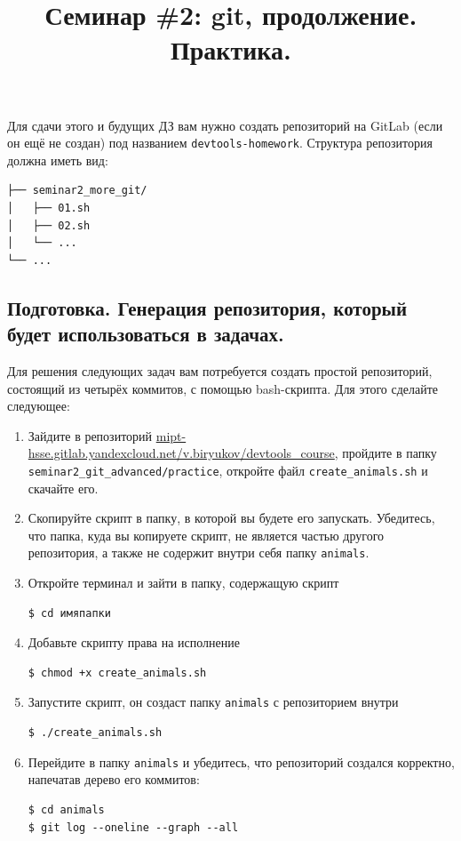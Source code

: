 \documentclass{article}
\begin{document}
\title{Семинар \#2: git, продолжение. Практика. \vspace{-5ex}}\date{}\maketitle
Для сдачи этого и будущих ДЗ вам нужно создать репозиторий на GitLab (если он ещё не создан) под названием \texttt{devtools-homework}. Структура репозитория должна иметь вид:
\begin{center}
\begin{BVerbatim}
├── seminar2_more_git/
│   ├── 01.sh
│   ├── 02.sh
│   └── ...
└── ...
\end{BVerbatim}
\end{center}



\subsection*{Подготовка. Генерация репозитория, который будет использоваться в задачах.}
Для решения следующих задач вам потребуется создать простой репозиторий, состоящий из четырёх коммитов, с помощью bash-скрипта. Для этого сделайте следующее:
\begin{enumerate}
\item Зайдите в репозиторий \href{https://mipt-hsse.gitlab.yandexcloud.net/v.biryukov/devtools_course}{mipt-hsse.gitlab.yandexcloud.net/v.biryukov/devtools\_course}, пройдите в папку\\ 
\texttt{seminar2\_git\_advanced/practice}, откройте файл \texttt{create\_animals.sh} и скачайте его.

\item Скопируйте скрипт в папку, в которой вы будете его запускать. Убедитесь, что папка, куда вы копируете скрипт, не является частью другого репозитория, а также не содержит внутри себя папку \texttt{animals}.

\item Откройте терминал и зайти в папку, содержащую скрипт
\begin{lstlisting}
$ cd имяпапки
\end{lstlisting}

\item Добавьте скрипту права на исполнение
\begin{lstlisting}[style=csMiptBash]
$ chmod +x create_animals.sh
\end{lstlisting}

\item Запустите скрипт, он создаст папку \texttt{animals} с репозиторием внутри
\begin{lstlisting}[style=csMiptBash]
$ ./create_animals.sh
\end{lstlisting}

\item Перейдите в папку \texttt{animals} и убедитесь, что репозиторий создался корректно, напечатав дерево его коммитов:
\begin{lstlisting}[style=csMiptBash]
$ cd animals
$ git log --oneline --graph --all
\end{lstlisting}
\end{enumerate}
\end{document}
